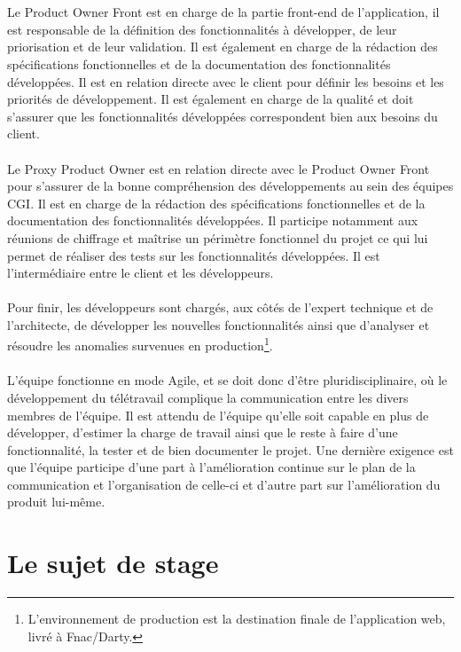 \documentclass[12pt, a4paper]{report}
\begin{document}
	\\\\
	Le Product Owner Front est en charge de la partie front-end de l'application, il est responsable de la définition des fonctionnalités à développer, de leur priorisation et de leur validation. Il est également en charge de la rédaction des spécifications fonctionnelles et de la documentation des fonctionnalités développées. Il est en relation directe avec le client pour définir les besoins et les priorités de développement. Il est également en charge de la qualité et doit s'assurer que les fonctionnalités développées correspondent bien aux besoins du client. 
	\\\\
	Le Proxy Product Owner est en relation directe avec le Product Owner Front pour s'assurer de la bonne compréhension des développements au sein des équipes CGI. Il est en charge de la rédaction des spécifications fonctionnelles et de la documentation des fonctionnalités développées. Il participe notamment aux réunions de chiffrage et maîtrise un périmètre fonctionnel du projet ce qui lui permet de réaliser des tests sur les fonctionnalités développées. Il est l'intermédiaire entre le client et les développeurs. 
	\\\\
	Pour finir, les développeurs sont chargés, aux côtés de l'expert technique et de l'architecte, de développer les nouvelles fonctionnalités ainsi que d'analyser et résoudre les anomalies survenues en production\footnote{L'environnement de production est la destination finale de l'application web, livré à Fnac/Darty.}.
	\\\\
	L'équipe fonctionne en mode Agile, et se doit donc d'être pluridisciplinaire, où le développement du télétravail complique la communication entre les divers membres de l'équipe. Il est attendu de l'équipe qu'elle soit capable en plus de développer, d'estimer la charge de travail ainsi que le reste à faire d'une fonctionnalité, la tester et de bien documenter le projet. Une dernière exigence est que l'équipe participe d'une part à l'amélioration continue sur le plan de la communication et l'organisation de celle-ci et d'autre part sur l'amélioration du produit lui-même.

	\section{Le sujet de stage}
\end{document}
